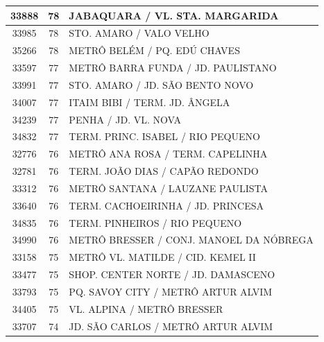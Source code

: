 \documentclass[
	12pt,				%
	oneside,			%
	a4paper,			%
	english,			%
	brazil				%
	]{abntex2ppgsi}
\begin{document}
\begin{apendicesenv}
\begin{longtable}{c|c|p{7cm}}
    33888 & 78    & JABAQUARA / VL. STA. MARGARIDA \\
\hline

    33985 & 78    & STO. AMARO / VALO VELHO \\
\hline

    35266 & 78    & METRÔ BELÉM / PQ. EDÚ CHAVES \\
\hline

    33597 & 77    & METRÔ BARRA FUNDA / JD. PAULISTANO \\
\hline

    33991 & 77    & STO. AMARO / JD. SÃO BENTO NOVO \\
\hline

    34007 & 77    & ITAIM BIBI / TERM. JD. ÂNGELA \\
\hline

    34239 & 77    & PENHA / JD. VL. NOVA \\
\hline

    34832 & 77    & TERM. PRINC. ISABEL / RIO PEQUENO \\
\hline

    32776 & 76    & METRÔ ANA ROSA / TERM. CAPELINHA \\
\hline

    32781 & 76    & TERM. JOÃO DIAS / CAPÃO REDONDO \\
\hline

    33312 & 76    & METRÔ SANTANA / LAUZANE PAULISTA \\
\hline

    33640 & 76    & TERM. CACHOEIRINHA / JD. PRINCESA \\
\hline

    34835 & 76    & TERM. PINHEIROS / RIO PEQUENO \\
\hline

    34990 & 76    & METRÔ BRESSER / CONJ. MANOEL DA NÓBREGA \\
\hline

    33158 & 75    & METRÔ VL. MATILDE / CID. KEMEL II \\
\hline

    33477 & 75    & SHOP. CENTER NORTE / JD. DAMASCENO \\
\hline

    33793 & 75    & PQ. SAVOY CITY / METRÔ ARTUR ALVIM \\
\hline

    34405 & 75    & VL. ALPINA / METRÔ BRESSER \\
\hline

    33707 & 74    & JD. SÃO CARLOS / METRÔ ARTUR ALVIM \\
\hline


\end{longtable}
\end{apendicesenv}
\end{document}

